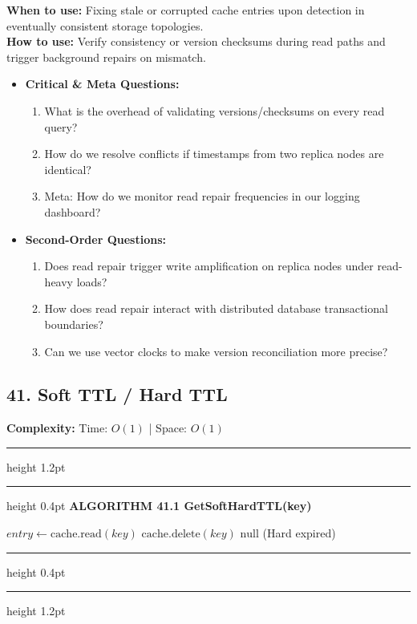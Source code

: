 \documentclass[11pt,a4paper]{article}
\newenvironment{textbookalgo}[2]{%
  \par\addvspace{1.2em}\noindent
  \hrule height 1.2pt
  \vspace{1.5pt}
  \hrule height 0.4pt
  \vspace{5pt}
  {\noindent\large\bfseries\sffamily ALGORITHM #1 \quad #2}
  \par\vspace{5pt}
  \RestyleAlgo{plain}
}{%
  \par\vspace{4pt}
  \hrule height 0.4pt
  \vspace{1.5pt}
  \hrule height 1.2pt
  \par\addvspace{1.2em}
}
\theoremstyle{definition}
\begin{document}
\noindent
\textbf{When to use:} Fixing stale or corrupted cache entries upon detection in eventually consistent storage topologies.\\
\textbf{How to use:} Verify consistency or version checksums during read paths and trigger background repairs on mismatch.
\begin{itemize}[leftmargin=*]
  \item[] \textbf{Critical \& Meta Questions:}
  \begin{enumerate}
    \item What is the overhead of validating versions/checksums on every read query?
    \item How do we resolve conflicts if timestamps from two replica nodes are identical?
    \item Meta: How do we monitor read repair frequencies in our logging dashboard?
  \end{enumerate}
  \item[] \textbf{Second-Order Questions:}
  \begin{enumerate}
    \item Does read repair trigger write amplification on replica nodes under read-heavy loads?
    \item How does read repair interact with distributed database transactional boundaries?
    \item Can we use vector clocks to make version reconciliation more precise?
  \end{enumerate}
\end{itemize}
\medskip


\clearpage
\subsection{41. Soft TTL / Hard TTL}

\noindent
\textbf{Complexity:} Time: $O(1)$ | Space: $O(1)$
\smallskip

\begin{textbookalgo}{41.1}{GetSoftHardTTL(key)}
\begin{algorithm}[H]
$entry \leftarrow \text{cache.read}(key)$\;
$\text{cache.delete}(key)$\;
\Return $\text{null}$ (Hard expired)\;
\end{algorithm}
\end{textbookalgo}
\end{document}
